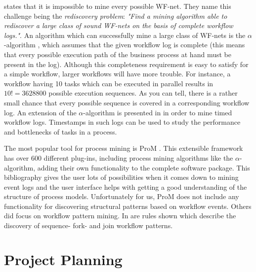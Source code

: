 \documentclass[a4paper,11pt]{article}
\begin{document}
\cite{VanDerAalst2002} states that it is impossible to mine every possible WF-net. They name this challenge being the \textit{rediscovery problem}: \textit{"Find a mining algorithm able to rediscover a large class of sound WF-nets on the basis of complete workflow logs."}\cite{VanDerAalst2002}. An algorithm which can successfully mine a large class of WF-nets is the $\alpha$-algorithm \cite{VanderAalst2003,VanDerAalst2002,VanderAalst2002TimedLogs}, which assumes that the given workflow log is complete (this means that every possible execution path of the business process at hand must be present in the log). Although this completeness requirement is easy to satisfy for a simple workflow, larger workflows will have more trouble. For instance, a workflow having 10 tasks which can be executed in parallel results in $10!=3628800$ possible execution sequences. As you can tell, there is a rather small chance that every possible sequence is covered in a corresponding workflow log. An extension of the $\alpha$-algorithm is presented in \cite{VanderAalst2002TimedLogs} in order to mine timed workflow logs. Timestamps in such logs can be used to study the performance and bottlenecks of tasks in a process. 






The most popular tool for process mining is ProM \cite{ProM6}. This extensible framework has over 600 different plug-ins, including process mining algorithms like the $\alpha$-algorithm, adding their own functionality to the complete software package. This bibliography gives the user lots of possibilities when it comes down to mining event logs and the user interface helps with getting a good understanding of the structure of process models. Unfortunately for us, ProM does not include any functionality for discovering structural patterns based on workflow events. Others did focus on workflow pattern mining. In \cite{WorkflowMiner2006} are rules shown which describe the discovery of sequence- fork- and join workflow patterns. 

\section{Project Planning}



\end{document}
